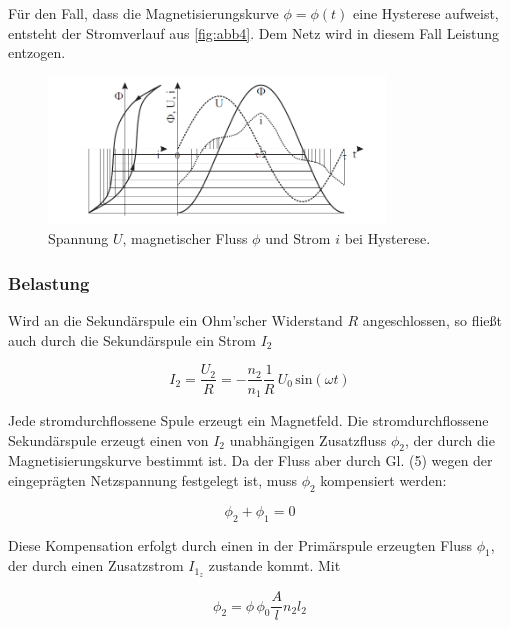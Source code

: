 \documentclass[11pt,ngerman]{scrartcl}
\begin{document}
Für den Fall, dass die Magnetisierungskurve $\phi = \phi (t)$ eine Hysterese aufweist, entsteht der
Stromverlauf aus \autoref{fig:abb4}. Dem Netz wird in diesem Fall Leistung entzogen.

\begin{figure}[H]
	\begin{center}
		\includegraphics[width=0.8\textwidth]{abb4}
	\end{center}
	\caption{Spannung $U$, magnetischer Fluss $\phi$ und Strom $i$ bei Hysterese.}
	\label{fig:abb4}
\end{figure}

\subsubsection{Belastung}

Wird an die Sekundärspule ein Ohm’scher Widerstand $R$ angeschlossen, so fließt auch durch
die Sekundärspule ein Strom $I_2$

\begin{equation}
	I_2 = \frac{U_2}{R} = -\frac{n_2}{n_1}\frac{1}{R} \,U_0\, \textrm{sin}(\omega t)
\end{equation}

Jede stromdurchflossene Spule erzeugt ein Magnetfeld. Die stromdurchflossene Sekundärspule
erzeugt einen von $I_2$ unabhängigen Zusatzfluss $\phi_2$, der durch die Magnetisierungskurve bestimmt
ist. Da der Fluss aber durch Gl. (5) wegen der eingeprägten Netzspannung festgelegt ist, muss
$\phi_2$ kompensiert werden:

\begin{equation}
	\phi_2 + \phi_1 = 0
\end{equation}

Diese Kompensation erfolgt durch einen in der Primärspule erzeugten Fluss $\phi_1$, der durch einen
Zusatzstrom $I_{1_z}$ zustande kommt. Mit

\begin{equation}
	\phi_2 = \phi \, \phi_0 \frac{A}{l}n_2 l_2
\end{equation}
\end{document}
